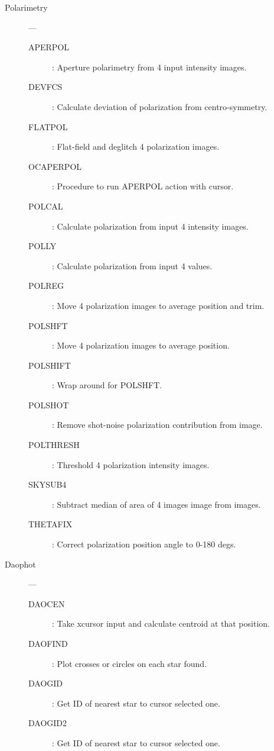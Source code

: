 \begin{description}
\item [Polarimetry] ---
\begin{description}
\item [APERPOL] : Aperture polarimetry from 4 input intensity images.
\item [DEVFCS] : Calculate deviation of polarization from centro-symmetry.
\item [FLATPOL] : Flat-field and deglitch 4 polarization images.
\item [OCAPERPOL] : Procedure to run APERPOL action with cursor.
\item [POLCAL] : Calculate polarization from input 4 intensity images.
\item [POLLY] : Calculate polarization from input 4 values.
\item [POLREG] : Move 4 polarization images to average position and trim.
\item [POLSHFT] : Move 4 polarization images to average position.
\item [POLSHIFT] : Wrap around for POLSHFT.
\item [POLSHOT] : Remove shot-noise polarization contribution from image.
\item [POLTHRESH] : Threshold 4 polarization intensity images.
\item [SKYSUB4] : Subtract median of area of 4 images image from images.
\item [THETAFIX] : Correct polarization position angle to 0-180 degs.
\end{description}

\item [Daophot] ---
\begin{description}
\item [DAOCEN] : Take xcursor input and calculate centroid at that position.
\item [DAOFIND] : Plot crosses or circles on each star found.
\item [DAOGID] : Get ID of nearest star to cursor selected one.
\item [DAOGID2] : Get ID of nearest star to cursor selected one.
\end{description}


\end{description}
